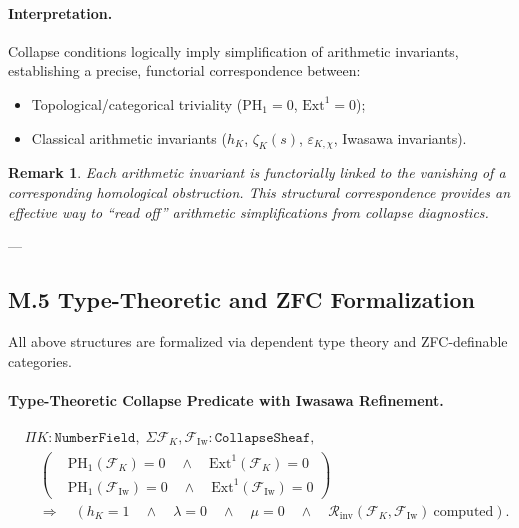 \documentclass[11pt]{article}
\newtheorem{remark}[theorem]{Remark}
\begin{document}
\paragraph{Interpretation.}
Collapse conditions logically imply simplification of arithmetic invariants, establishing a precise, functorial correspondence between:

\begin{itemize}
    \item Topological/categorical triviality (\( \mathrm{PH}_1 = 0 \), \( \mathrm{Ext}^1 = 0 \));
    \item Classical arithmetic invariants (\( h_K \), \( \zeta_K(s) \), \( \varepsilon_{K,\chi} \), Iwasawa invariants).
\end{itemize}

\begin{remark}
Each arithmetic invariant is functorially linked to the vanishing of a corresponding homological obstruction.  
This structural correspondence provides an effective way to ``read off'' arithmetic simplifications from collapse diagnostics.
\end{remark}

---

\subsection*{M.5 Type-Theoretic and ZFC Formalization}

All above structures are formalized via dependent type theory and ZFC-definable categories.

\paragraph{Type-Theoretic Collapse Predicate with Iwasawa Refinement.}
\[
\begin{aligned}
&\Pi K : \texttt{NumberField},\; 
\Sigma \mathcal{F}_K, \mathcal{F}_{\mathrm{Iw}} : \texttt{CollapseSheaf}, \\
&\quad
\left(
\begin{aligned}
& \mathrm{PH}_1(\mathcal{F}_K) = 0 \quad \wedge \quad \mathrm{Ext}^1(\mathcal{F}_K) = 0 \\
& \mathrm{PH}_1(\mathcal{F}_{\mathrm{Iw}}) = 0 \quad \wedge \quad \mathrm{Ext}^1(\mathcal{F}_{\mathrm{Iw}}) = 0
\end{aligned}
\right)
\\
&\quad \Rightarrow\quad
\left(
h_K = 1 \quad \wedge \quad
\lambda = 0 \quad \wedge \quad
\mu = 0 \quad \wedge \quad
\mathcal{R}_{\mathrm{inv}}(\mathcal{F}_K,\mathcal{F}_{\mathrm{Iw}})\ \text{computed}
\right).
\end{aligned}
\]
\end{document}
